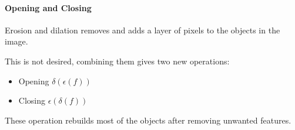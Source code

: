 \documentclass[letterpaper,10pt,english]{sphinxmanual}
\begin{document}
\paragraph{Opening and Closing}
\label{\detokenize{04-BasicSegmentation_Part2:opening-and-closing}}
\sphinxAtStartPar
Erosion and dilation removes and adds a layer of pixels to the objects in the image.

\sphinxAtStartPar
This is not desired, combining them gives two new operations:
\begin{itemize}
\item {} 
\sphinxAtStartPar
Opening \(\delta(\epsilon(f))\)

\item {} 
\sphinxAtStartPar
Closing \(\epsilon(\delta(f))\)

\end{itemize}

\sphinxAtStartPar
These operation rebuilds most of the objects after removing unwanted features.
\end{document}
